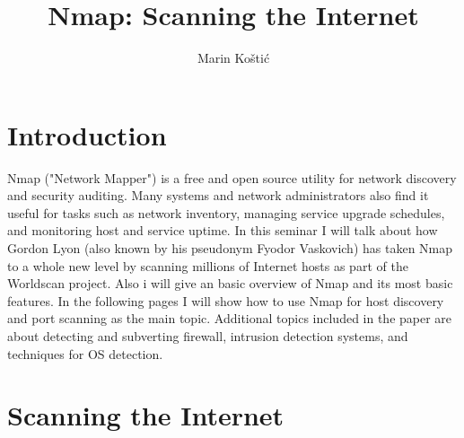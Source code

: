 \documentclass[times, utf8, seminar,english]{fer}
\begin{document}
\title{Nmap: Scanning the Internet}
\author{Marin Koštić}

\maketitle

\tableofcontents

\chapter{Introduction}
Nmap ("Network Mapper") is a free and open source utility for network discovery and security auditing. Many systems and network administrators also find it useful for tasks such as network inventory, managing service upgrade schedules, and monitoring host and service uptime. In this seminar I will talk about how Gordon Lyon (also known by his pseudonym Fyodor Vaskovich) has taken Nmap to a whole new level by scanning millions of Internet hosts as part of the Worldscan project. Also i will give an basic overview of Nmap and its most basic features. In the following pages I will show how to use Nmap for host discovery and port scanning as the main topic. Additional topics included in the paper are about detecting and subverting firewall, intrusion detection systems, and techniques for OS detection.

\chapter{Scanning the Internet}
\end{document}
